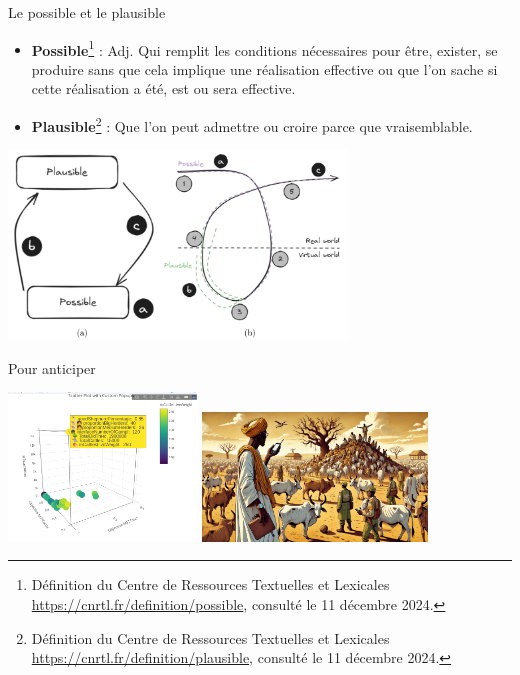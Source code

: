 \documentclass[newPxFont]{beamer}
\begin{document}
\begin{frame}[c]{Le possible et le plausible}
  \vspace{-1cm}
  \begin{itemize}
    \item \textbf{Possible}\footnote{Définition du Centre de Ressources Textuelles et Lexicales \url{https://cnrtl.fr/definition/possible}, consulté le 11 décembre 2024.} : Adj. Qui remplit les conditions nécessaires pour être, exister, se produire sans que cela implique une réalisation effective ou que l'on sache si cette réalisation a été, est ou sera effective.

    \item \textbf{Plausible}\footnote{Définition du Centre de Ressources Textuelles et Lexicales \url{https://cnrtl.fr/definition/plausible}, consulté le 11 décembre 2024.} : Que l'on peut admettre ou croire parce que vraisemblable.
\end{itemize}
\begin{center}
 \includegraphics[width=9cm]{img/possiblePlausible.png}
\end{center}
\end{frame}

\begin{frame}[c]{Pour anticiper}
  \vspace{-1cm}
\begin{center}
  \includegraphics[width=5cm]{img/dundiModel_explo.png}
  \includegraphics[width=6cm]{img/dundiModel.png}
\end{center}
\end{frame}
\end{document}
